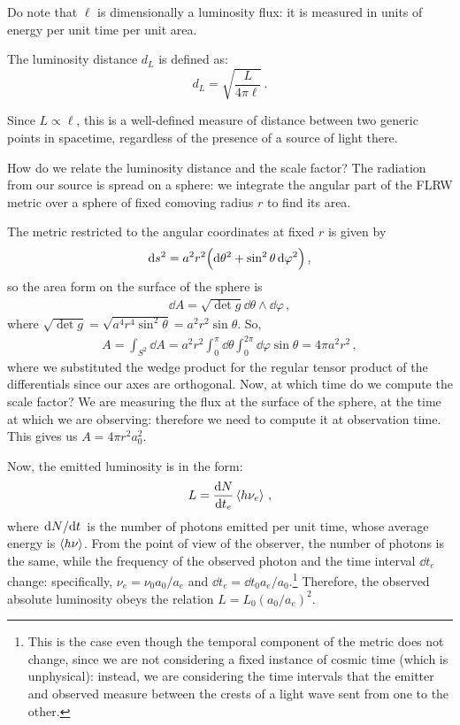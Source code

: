 \documentclass[main.tex]{subfiles}
\begin{document}
Do note that \(\ell \) is dimensionally a luminosity flux: it is measured in units of energy per unit time per unit area.

\begin{definition}  
The luminosity distance \(d_L\) is defined as:
%
\begin{equation}
d_L = \sqrt{\frac{L}{4 \pi \ell} } \,.
\end{equation}

Since \(L \propto \ell\), this is a well-defined measure of distance between two generic points in spacetime, regardless of the presence of a source of light there.
\end{definition}
  
How do we relate the luminosity distance and the scale factor?
The radiation from our source is spread on a sphere: we integrate the angular part of the FLRW metric over a sphere of fixed comoving radius \(r\) to find its area.

The metric restricted to the angular coordinates at fixed \(r\) is given by 
%
\begin{align}
\dd{s^2} = a^2 r^2 \qty(\dd{\theta^2} + \sin^2\theta \dd{\varphi^2})
\,,
\end{align}
%
so the area form on the surface of the sphere is 
%
\begin{align}
\dd{A} = \sqrt{ \det g} \dd{\theta } \wedge \dd{\varphi }
\,,
\end{align}
%
where \(\sqrt{ \det g} = \sqrt{a^{4} r^{4} \sin^2\theta } = a^2r^2 \sin \theta \). 
So,
%
\begin{align}
A = \int_{S^{2}}  \dd{A} = a^2r^2 \int_{0}^{\pi } \dd{\theta } \int_{0}^{2 \pi } \dd{\varphi } \sin \theta = 4 \pi a^2r^2 
\,,
\end{align}
%
where we substituted the wedge product for the regular tensor product of the differentials since our axes are orthogonal.
Now, at which time do we compute the scale factor? We are measuring the flux at the surface of the sphere, at the time at which we are observing: therefore we need to compute it at observation time. This gives us \(A = 4 \pi r^2a_0^2\).

Now, the emitted luminosity is in the form: 
%
\begin{align}
L = \dv{N}{t_{e}} \expval{h \nu_{e} }
\,,
\end{align}
%
where \(\dv*{N}{t}\) is the number of photons emitted per unit time, whose average energy is \(\expval{h \nu }\).
From the point of view of the observer, the number of photons is the same, while the frequency of the observed photon and the time interval \(\dd{t_{e}}\) change: specifically, \(\nu_{e} = \nu_0 a_0 / a_e\) and \(\dd{t_{e}} = \dd{t_0 } a_e / a_0 \).\footnote{This is the case even though the temporal component of the metric does not change, since we are not considering a fixed instance of cosmic time (which is unphysical): instead, we are considering the time intervals that the emitter and observed measure between the crests of a light wave sent from one to the other.}
Therefore, the observed absolute luminosity obeys the relation \(L= L_0 (a_0 / a_e)^2 \).
\end{document}
